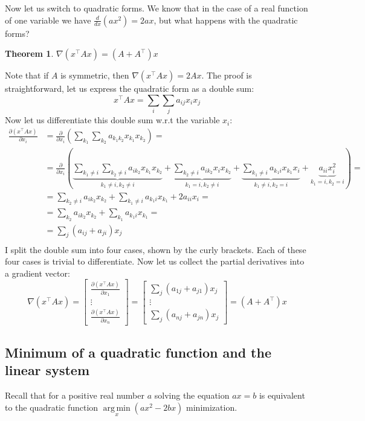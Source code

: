 \documentclass[notitlepage,oneside]{book}
\DeclareMathOperator*{\argmin}{arg\,min}
\newtheorem{theorem}{Theorem}
\begin{document}
Now let us switch to quadratic forms.
We know that in the case of a real function of one variable we have $\frac{d}{dx}(ax^2) = 2ax$, but what happens with the quadratic forms?
\begin{theorem}
$\nabla (x^\top A x) = (A+A^\top)x$
\end{theorem}
Note that if $A$ is symmetric, then $\nabla (x^\top A x) = 2Ax$.
The proof is straightforward, let us express the quadratic form as a double sum:
$$x^\top A x = \sum\limits_i\sum\limits_j a_{ij} x_i x_j$$
Now let us differentiate this double sum w.r.t the variable $x_i$:
\begin{align*}
\frac{\partial (x^\top A x)}{\partial x_i} 
&= \frac{\partial}{\partial x_i}  \left(\sum\limits_{k_1}\sum\limits_{k_2} a_{k_1 k_2} x_{k_1} x_{k_2}\right) = \\
&= \frac{\partial}{\partial x_i}  \left(
\underbrace{\sum\limits_{k_1\neq i}\sum\limits_{k_2\neq i} a_{ik_2}x_{k_1} x_{k_2}}_{k_1 \neq i, k_2 \neq i}+\underbrace{\sum\limits_{k_2\neq i} a_{ik_2}x_i x_{k_2}}_{k_1 = i, k_2\neq i}+
\underbrace{\sum\limits_{k_1\neq i} a_{k_1 i} x_{k_1} x_i}_{k_1 \neq i, k_2 = i}+
\underbrace{a_{ii}x_i^2}_{k_1 = i, k_2 = i}\right) = \\
& = \sum\limits_{k_2\neq i} a_{ik_2}x_{k_2} + \sum\limits_{k_1\neq i} a_{k_1 i} x_{k_1} + 2 a_{ii} x_i = \\
& = \sum\limits_{k_2} a_{ik_2}x_{k_2} + \sum\limits_{k_1} a_{k_1 i} x_{k_1} = \\
& = \sum\limits_{j} (a_{ij} + a_{ji}) x_j \\
\end{align*}
I split the double sum into four cases, shown by the curly brackets.
Each of these four cases is trivial to differentiate. 
Now let us collect the partial derivatives  into a gradient vector:
$$\nabla(x^\top A x) = \begin{bmatrix}\frac{\partial (x^\top Ax)}{\partial x_1} \\ \vdots \\ \frac{\partial (x^\top A x)}{\partial x_n} \end{bmatrix}  = \begin{bmatrix}\sum\limits_{j} (a_{1j} + a_{j1}) x_j \\ \vdots \\ \sum\limits_{j} (a_{nj} + a_{jn}) x_j \end{bmatrix}  = (A+A^\top)x
$$

\subsection{Minimum of a quadratic function and the linear system}
Recall that for a positive real number $a$ solving the equation
$ax=b$ is equivalent to the quadratic function $\argmin\limits_x(ax^2 - 2bx)$ minimization.
\end{document}
